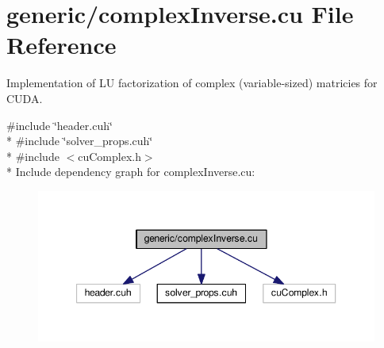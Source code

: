 \hypertarget{complexInverse_8cu}{}\section{generic/complex\+Inverse.cu File Reference}
\label{complexInverse_8cu}


Implementation of LU factorization of complex (variable-\/sized) matricies for C\+U\+DA.  


{\ttfamily \#include \char`\"{}header.\+cuh\char`\"{}}\\*
{\ttfamily \#include \char`\"{}solver\+\_\+props.\+cuh\char`\"{}}\\*
{\ttfamily \#include $<$cu\+Complex.\+h$>$}\\*
Include dependency graph for complex\+Inverse.\+cu\+:\nopagebreak
\begin{figure}[H]
\begin{center}
\leavevmode
\includegraphics[width=347pt]{complexInverse_8cu__incl}
\end{center}
\end{figure}
